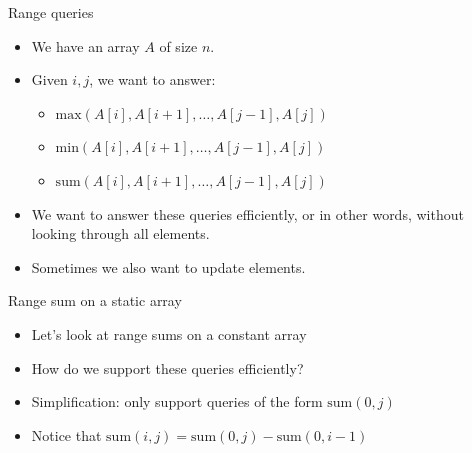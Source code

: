 \documentclass{beamer}
\begin{document}
\begin{frame}[plain]{Range queries}
    \vspace{30pt}
    \begin{itemize}
        \item<1-> We have an array $A$ of size $n$.
        \item<2-> Given $i,j$, we want to answer:
            \begin{itemize}
                \item<3-> $\mathrm{max}(A[i],A[i+1],\ldots,A[j-1],A[j])$
                \item<4-> $\mathrm{min}(A[i],A[i+1],\ldots,A[j-1],A[j])$
                \item<5-> $\mathrm{sum}(A[i],A[i+1],\ldots,A[j-1],A[j])$
            \end{itemize}
        \item<6-> We want to answer these queries efficiently, or in other words, without looking through all elements.
        \item<7-> Sometimes we also want to update elements.
    \end{itemize}
\end{frame}

\begin{frame}[plain]{Range sum on a static array}
    \begin{itemize}
        \item<1-> Let's look at range sums on a constant array
        \item<2-> How do we support these queries efficiently?
    \end{itemize}

     {
    \begin{itemize}
        \item<3-> Simplification: only support queries of the form $\mathrm{sum}(0, j)$
        \item<4-> Notice that $\mathrm{sum}(i,j) = \mathrm{sum}(0,j) - \mathrm{sum}(0,i-1)$
    \end{itemize} }
\end{frame}
\end{document}

